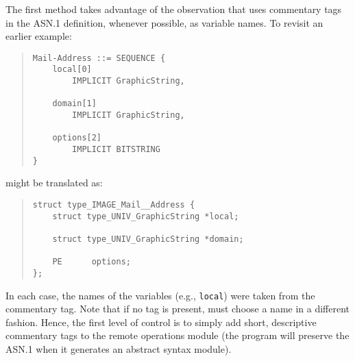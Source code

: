 The first method takes advantage of the observation that  uses
commentary tags in the ASN.1 definition, whenever possible, as variable names.
To revisit an earlier example:
\begin{quote}\small\begin{verbatim}
Mail-Address ::= SEQUENCE {
    local[0]
        IMPLICIT GraphicString,

    domain[1]
        IMPLICIT GraphicString,

    options[2]
        IMPLICIT BITSTRING
}
\end{verbatim}\end{quote}
might be translated as:
\begin{quote}\small\begin{verbatim}
struct type_IMAGE_Mail__Address {
    struct type_UNIV_GraphicString *local;

    struct type_UNIV_GraphicString *domain;

    PE      options;
};
\end{verbatim}\end{quote}
In each case, the names of the variables (e.g., \verb"local") were taken from
the commentary tag.
Note that if no tag is present,
 must choose a name in a different fashion.
Hence,
the first level of control is to simply add short, descriptive commentary tags
to the remote operations module (the  program will preserve the
ASN.1 when it generates an abstract syntax module).

